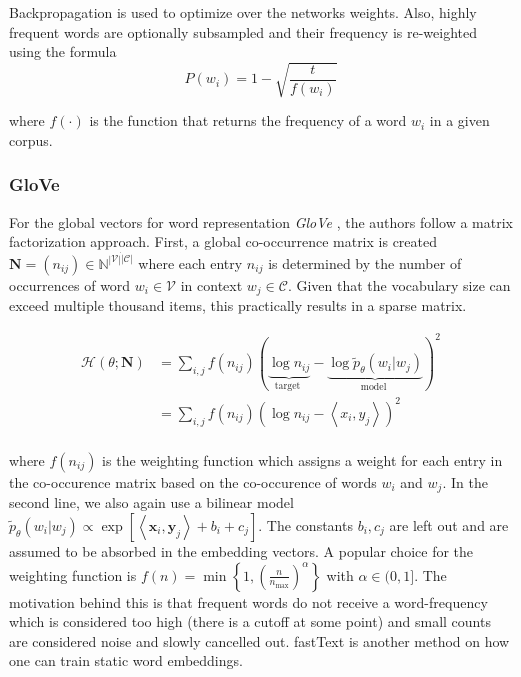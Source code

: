 \documentclass[a4paper,12pt,oneside,openright]{report}
\begin{document}
Backpropagation is used to optimize over the networks weights. 
Also, highly frequent words are optionally subsampled and their frequency is re-weighted using the formula $$
P\left(w_{i}\right)=1-\sqrt{\frac{t}{f\left(w_{i}\right)}}
$$

where $f( \cdot )$ is the function that returns the frequency of a word $w_i$ in a given corpus.

\subsubsection{GloVe}

For the global vectors for word representation \textit{GloVe} \cite{pennington14}, the authors follow a matrix factorization approach.
First, a global co-occurrence matrix is created $\mathbf{N} = (n_{ij}) \in \mathbb{N}^{|\mathcal{V}| \dot |\mathcal{C}|}$ where each entry $n_{ij}$ is determined by the number of occurrences of word $w_i \in \mathcal{V}$ in context $w_j \in \mathcal{C}$.
Given that the vocabulary size can exceed multiple thousand items, this practically results in a sparse matrix.

\begin{align}
\mathcal{H}(\theta ; \mathbf{N}) &=
\sum_{i, j} f\left(n_{i j}\right)(\underbrace{\log n_{i j}}_{\text {target }}-\underbrace{\log \tilde{p}_{\theta}\left(w_{i} | w_{j}\right)}_{\text {model }})^{2} \\
&= \sum_{i, j} f\left(n_{i j}\right)(\log n_{i j} - \left\langle x_i, y_j \right\rangle )^{2} \\
\end{align}

where $f(n_{ij})$ is the weighting function which assigns a weight for each entry in the co-occurence matrix based on the co-occurence of words $w_i$ and $w_j$. 
In the second line, we also again use a bilinear model $\tilde{p}_{\theta}\left(w_{i} | w_{j}\right) \propto \exp \left[\left\langle\mathbf{x}_{i}, \mathbf{y}_{j}\right\rangle+b_{i}+c_{j}\right]$.
The constants $b_i, c_j$ are left out and are assumed to be absorbed in the embedding vectors.
A popular choice for the weighting function is 
$
f(n) = \min \left\lbrace 1, \left(\frac{n}{n_{\max}}\right)^{\alpha} \right\rbrace
$
with $\alpha \in (0, 1]$.
The motivation behind this is that frequent words do not receive a word-frequency which is considered too high (there is a cutoff at some point) and small counts are considered noise and slowly cancelled out.
fastText \cite{bojanowski17} is another method on how one can train static word embeddings.
\end{document}
